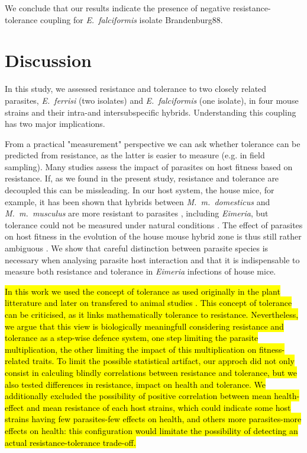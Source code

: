 \documentclass[12pt]{article}
\begin{document}
We conclude that our results indicate the presence of negative resistance-tolerance coupling for \textit{E.~falciformis} isolate Brandenburg88.

\section*{Discussion}

In this study, we assessed resistance and tolerance to two closely related parasites, \textit{E.~ferrisi} (two isolates) and \textit{E.~falciformis} (one isolate), in four mouse strains and their intra-and intersubspecific hybrids. Understanding this coupling has two major implications. \par

From a practical "measurement" perspective we can ask whether tolerance can be predicted from resistance, as the latter is easier to measure (e.g. in field sampling). Many studies assess the impact of parasites on host fitness based on resistance. If, as we found in the present study, resistance and tolerance are decoupled this can be missleading. In our host system, the house mice, for example, it has been shown that hybrids between \textit{M.~m.~domesticus} and \textit{M.~m.~musculus} are more resistant to parasites \citep{baird_where_2012, Balard2020}, including \textit{Eimeria}, but tolerance could not be measured under natural conditions \citep{Balard2020}. The effect of parasites on host fitness in the evolution of the house mouse hybrid zone is thus still rather ambiguous \citep{baird_shifting_2019}. We show that careful distinction between parasite species is necessary when analysing parasite host interaction \parencite[see also][]{jarquin-diaz_detection_2019} and that it is indispensable to measure both resistance and tolerance in \textit{Eimeria} infections of house mice. \par

\hl{In this work we used the concept of tolerance as used originally in the plant litterature \mbox{\citep{Fineblum1995}} and later on transfered to animal studies \mbox{\citep{raaberg_disentangling_2007}}. This concept of tolerance can be criticised, as it links mathematically tolerance to resistance. Nevertheless, we argue that this view is biologically meaningfull considering resistance and tolerance as a step-wise defence system, one step limiting the parasite multiplication, the other limiting the impact of this multiplication on fitness-related traits. To limit the possible statistical artifact, our approch did not only consist in calculing blindly correlations between resistance and tolerance, but we also tested differences in resistance, impact on health and tolerance. We additionally excluded the possibility of positive correlation between mean health-effect and mean resistance of each host strains, which could indicate some host strains having few parasites-few effects on health, and others more parasites-more effects on health: this configuration would limitate the possibility of detecting an actual resistance-tolerance trade-off.}
\par
\end{document}
